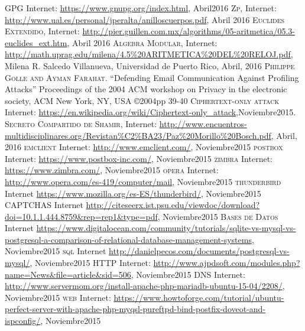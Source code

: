\documentclass[12pt,oneside,onecolumn,openany]{report}
\begin{document}
\begin{thebibliography}{a}
   \textsc{GPG} Internet: \url{https://www.gnupg.org/index.html}, Abril2016
   \textsc{Zp}, Internet: \url{http://www.ual.es/personal/jperalta/anilloscuerpos.pdf}, Abril 2016
   \textsc{Euclides Extendido}, Internet: \url{http://pier.guillen.com.mx/algorithms/05-aritmetica/05.3-euclides_ext.htm}, Abril 2016
   \textsc{Algebra Modular}, Internet: \url{http://math.uprag.edu/milena/4.5\%20ARITMETICA\%20DEL\%20RELOJ.pdf}, Milena R. Salcedo Villanueva, Universidad de Puerto Rico, Abril, 2016
   \textsc{Philippe  Golle and Ayman  Farahat}. ``Defending  Email  Communication  Against  Profiling  Attacks'' Proceedings  of  the  2004  ACM  workshop  on  Privacy  in  the  electronic  society, ACM  New  York,  NY, USA ©2004pp 39-40
   \textsc{Ciphertext-only attack} Internet: \url{https://en.wikipedia.org/wiki/Ciphertext-only_attack},Noviembre2015. 
   \textsc{Secreto Compartido de Shamir}, Internet: \url{http://www.encuentros-multidisciplinares.org/Revistan\%C2\%BA23/Paz\%20Morillo\%20Bosch.pdf}, Abril, 2016
   \textsc{emclient} Internet: \url{http://www.emclient.com/}, Noviembre2015
   \textsc{postbox} Internet: \url{https://www.postbox-inc.com/}, Noviembre2015
   \textsc{zimbra} Internet: \url{https://www.zimbra.com/}, Noviembre2015
   \textsc{opera} Internet: \url{http://www.opera.com/es-419/computer/mail}, Noviembre2015
   \textsc{thunderbird} Internet \url{https://www.mozilla.org/es-ES/thunderbird/}, Noviembre2015
   \textsc{CAPTCHAS} Internet \url{http://citeseerx.ist.psu.edu/viewdoc/download?doi=10.1.1.444.8759&rep=rep1&type=pdf}, Noviembre2015
   \textsc{Bases de Datos} Internet \url{https://www.digitalocean.com/community/tutorials/sqlite-vs-mysql-vs-postgresql-a-comparison-of-relational-database-management-systems}, Noviembre2015
   \textsc{sql} Internet \url{http://danielpecos.com/documents/postgresql-vs-mysql/}, Noviembre2015
   \textsc{HTTP} Internet: \url{http://www.ajpdsoft.com/modules.php?name=News&file=article&sid=506}, Noviembre2015
   \textsc{DNS} Internet: \url{http://www.servermom.org/install-apache-php-mariadb-ubuntu-15-04/2208/}, Noviembre2015
   \textsc{web} Internet: \url{https://www.howtoforge.com/tutorial/ubuntu-perfect-server-with-apache-php-myqsl-pureftpd-bind-postfix-doveot-and-ispconfig/}, Noviembre2015
 
 
 
 
\end{thebibliography}


 
 
\end{document}
